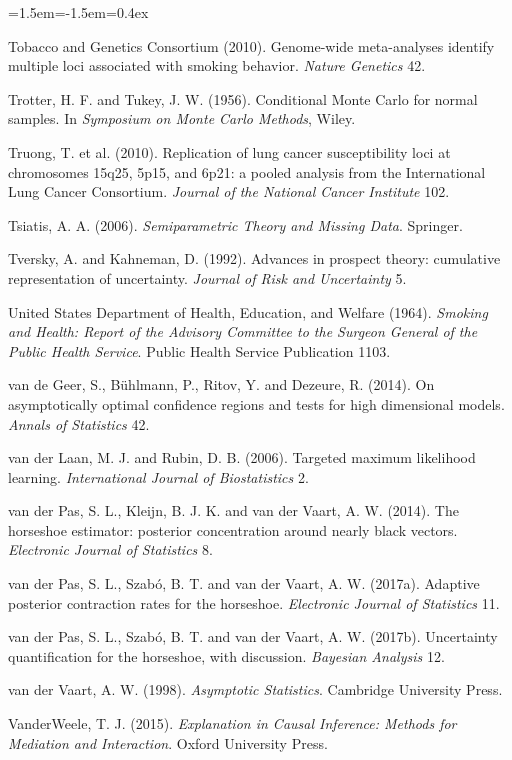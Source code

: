 \begin{list}{}{\leftmargin=1.5em\itemindent=-1.5em\itemsep=0.4ex}
\item Tobacco and Genetics Consortium (2010). Genome-wide meta-analyses identify multiple loci associated with smoking behavior. \emph{Nature Genetics} 42.
\item Trotter, H. F. and Tukey, J. W. (1956). Conditional Monte Carlo for normal samples. In \emph{Symposium on Monte Carlo Methods}, Wiley.
\item Truong, T. et al. (2010). Replication of lung cancer susceptibility loci at chromosomes 15q25, 5p15, and 6p21: a pooled analysis from the International Lung Cancer Consortium. \emph{Journal of the National Cancer Institute} 102.
\item Tsiatis, A. A. (2006). \emph{Semiparametric Theory and Missing Data}. Springer.
\item Tversky, A. and Kahneman, D. (1992). Advances in prospect theory: cumulative representation of uncertainty. \emph{Journal of Risk and Uncertainty} 5.
\item United States Department of Health, Education, and Welfare (1964). \emph{Smoking and Health: Report of the Advisory Committee to the Surgeon General of the Public Health Service}. Public Health Service Publication 1103.
\item van de Geer, S., B\"uhlmann, P., Ritov, Y. and Dezeure, R. (2014). On asymptotically optimal confidence regions and tests for high dimensional models. \emph{Annals of Statistics} 42.
\item van der Laan, M. J. and Rubin, D. B. (2006). Targeted maximum likelihood learning. \emph{International Journal of Biostatistics} 2.
\item van der Pas, S. L., Kleijn, B. J. K. and van der Vaart, A. W. (2014). The horseshoe estimator: posterior concentration around nearly black vectors. \emph{Electronic Journal of Statistics} 8.
\item van der Pas, S. L., Szab\'o, B. T. and van der Vaart, A. W. (2017a). Adaptive posterior contraction rates for the horseshoe. \emph{Electronic Journal of Statistics} 11.
\item van der Pas, S. L., Szab\'o, B. T. and van der Vaart, A. W. (2017b). Uncertainty quantification for the horseshoe, with discussion. \emph{Bayesian Analysis} 12.
\item van der Vaart, A. W. (1998). \emph{Asymptotic Statistics}. Cambridge University Press.
\item VanderWeele, T. J. (2015). \emph{Explanation in Causal Inference: Methods for Mediation and Interaction}. Oxford University Press.

\end{list}
